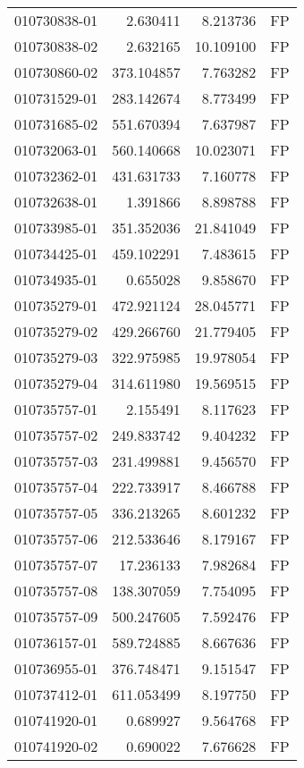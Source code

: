 \begin{tabular}{lrrl}
010730838-01 &    2.630411 &     8.213736 &   FP \\
010730838-02 &    2.632165 &    10.109100 &   FP \\
010730860-02 &  373.104857 &     7.763282 &   FP \\
010731529-01 &  283.142674 &     8.773499 &   FP \\
010731685-02 &  551.670394 &     7.637987 &   FP \\
010732063-01 &  560.140668 &    10.023071 &   FP \\
010732362-01 &  431.631733 &     7.160778 &   FP \\
010732638-01 &    1.391866 &     8.898788 &   FP \\
010733985-01 &  351.352036 &    21.841049 &   FP \\
010734425-01 &  459.102291 &     7.483615 &   FP \\
010734935-01 &    0.655028 &     9.858670 &   FP \\
010735279-01 &  472.921124 &    28.045771 &   FP \\
010735279-02 &  429.266760 &    21.779405 &   FP \\
010735279-03 &  322.975985 &    19.978054 &   FP \\
010735279-04 &  314.611980 &    19.569515 &   FP \\
010735757-01 &    2.155491 &     8.117623 &   FP \\
010735757-02 &  249.833742 &     9.404232 &   FP \\
010735757-03 &  231.499881 &     9.456570 &   FP \\
010735757-04 &  222.733917 &     8.466788 &   FP \\
010735757-05 &  336.213265 &     8.601232 &   FP \\
010735757-06 &  212.533646 &     8.179167 &   FP \\
010735757-07 &   17.236133 &     7.982684 &   FP \\
010735757-08 &  138.307059 &     7.754095 &   FP \\
010735757-09 &  500.247605 &     7.592476 &   FP \\
010736157-01 &  589.724885 &     8.667636 &   FP \\
010736955-01 &  376.748471 &     9.151547 &   FP \\
010737412-01 &  611.053499 &     8.197750 &   FP \\
010741920-01 &    0.689927 &     9.564768 &   FP \\
010741920-02 &    0.690022 &     7.676628 &   FP \\

\end{tabular}

